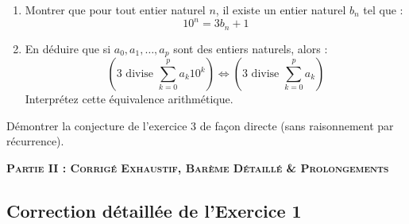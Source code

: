 \documentclass[11pt,a4paper]{article}
\newcommand{\bareme}[1]{\hfill\textbf{\textcolor{secondary}{\sffamily[#1]}}}
\begin{document}
\begin{enoncebox}[Exercice 5 \bareme{4 points}]
\begin{enumerate}[label=\textbf{\arabic*.}]
    \item Montrer que pour tout entier naturel $n$, il existe un entier naturel $b_n$ tel que :
    \[
    10^n = 3b_n + 1
    \] \bareme{2 pts}
    \item En déduire que si $a_0, a_1, \dots, a_p$ sont des entiers naturels, alors :
    \[
    \left( 3 \text{ divise } \sum_{k=0}^p a_k 10^k \right) \iff \left( 3 \text{ divise } \sum_{k=0}^p a_k \right)
    \]
    Interprétez cette équivalence arithmétique. \bareme{2 pts}
\end{enumerate}
\end{enoncebox}

\begin{enoncebox}
Démontrer la conjecture de l'exercice 3 de façon directe (sans raisonnement par récurrence). \bareme{+2 pts}
\end{enoncebox}

\newpage

\begin{center}
  \large\textbf{\textsc{Partie II : Corrigé Exhaustif, Barème Détaillé \& Prolongements}}
\end{center}

\vspace{0.2cm}

\subsection*{Correction détaillée de l'Exercice 1}
\end{document}

